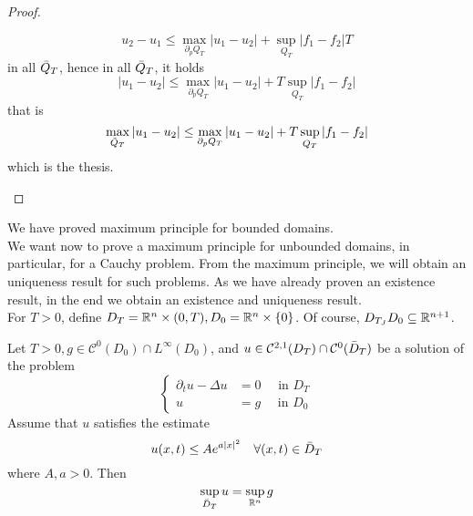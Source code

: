 \begin{ProofBox}
\begin{proof}
\begin{itemize}
            \begin{equation*}
                u_2-u_1 \leq \max_{ \partial_p Q_T} |u_1-u_2| + \sup_{Q_T} |f_1-f_2| T
            \end{equation*}
            in all $\Bar{Q}_T$, hence in all $\Bar{Q}_T$, it holds
            \begin{equation*}
                |u_1-u_2| \leq \max_{ \partial_p Q_T} |u_1-u_2| + T \sup_{Q_T} |f_1-f_2|
            \end{equation*}
            that is 
            \begin{equation*}
                \max_{\Bar{Q}_T}  |u_1-u_2| \leq \max_{ \partial_p Q_T} |u_1 - u_2| + T \sup_{Q_T} |f_1-f_2|
            \end{equation*}
            which is the thesis. 
        \end{itemize}
    \end{proof}
\end{ProofBox}
We have proved maximum principle for bounded domains. \\
We want now to prove a maximum principle for unbounded domains, in particular, for a Cauchy problem. From the maximum principle, we will obtain an uniqueness result for such problems. As we have already proven an existence result, in the end we obtain an existence and uniqueness result. \\
For $T > 0$, define $D_T = \mathbb{R}^n \times (0,T), D_0 = \mathbb{R}^n \times \{0\}$. Of course, $D_{T_J} D_0 \subseteq \mathbb{R}^{n+1}$. 
\begin{ThBox}
    \begin{Th}
        Let $T > 0, g \in \mathcal{C}^0(D_0) \cap L^\infty(D_0)$, and $u \in \mathcal{C}^{2,1}(D_T) \cap \mathcal{C}^0(\Bar{D}_T)$ be a solution of the problem
        \begin{equation*}
            \begin{cases}
                \partial_t u - \Delta u &= 0 \quad \text{ in } D_T \\
                u &= g \quad \text{ in } D_0
            \end{cases}
        \end{equation*}
        Assume that $u$ satisfies the estimate
        \begin{equation*}
            u(x,t) \leq A e^{a |x|^2} \quad \forall (x,t) \in \Bar{D}_T
        \end{equation*}
        where $A,a > 0$. Then
        \begin{equation*}
            \sup_{\Bar{D}_T}u = \sup_{\mathbb{R}^n} g
        \end{equation*}
    \end{Th}
\end{ThBox}
